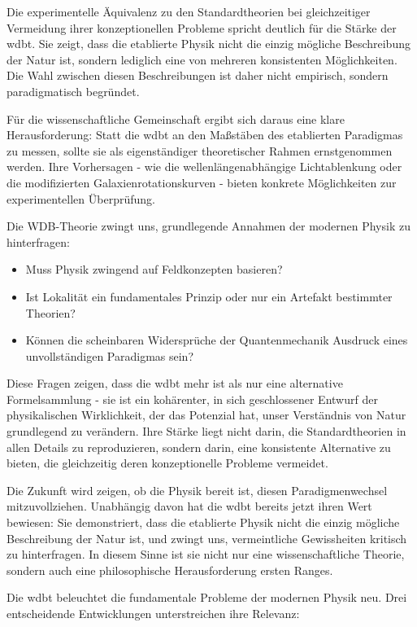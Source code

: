 \documentclass[11pt, a5paper, twoside, openright]{book}
\begin{document}
Die experimentelle Äquivalenz zu den Standardtheorien bei gleichzeitiger Vermeidung ihrer konzeptionellen Probleme spricht deutlich für die Stärke der \gls{wdbt}. Sie zeigt,
dass die etablierte Physik nicht die einzig mögliche Beschreibung der Natur ist, sondern lediglich eine von mehreren konsistenten Möglichkeiten. Die Wahl zwischen diesen Beschreibungen
ist daher nicht empirisch, sondern paradigmatisch begründet.

Für die wissenschaftliche Gemeinschaft ergibt sich daraus eine klare Herausforderung: Statt die \gls{wdbt} an den Maßstäben des etablierten Paradigmas zu messen, sollte sie als
eigenständiger theoretischer Rahmen ernstgenommen werden. Ihre Vorhersagen - wie die wellenlängenabhängige Lichtablenkung oder die modifizierten Galaxienrotationskurven - bieten konkrete
Möglichkeiten zur experimentellen Überprüfung.

Die WDB-Theorie zwingt uns, grundlegende Annahmen der modernen Physik zu hinterfragen:
\begin{itemize}
    \item Muss Physik zwingend auf Feldkonzepten basieren?
    \item Ist Lokalität ein fundamentales Prinzip oder nur ein Artefakt bestimmter Theorien?
    \item Können die scheinbaren Widersprüche der Quantenmechanik Ausdruck eines unvollständigen Paradigmas sein?
\end{itemize}
Diese Fragen zeigen, dass die \gls{wdbt} mehr ist als nur eine alternative Formelsammlung - sie ist ein kohärenter, in sich geschlossener Entwurf der physikalischen Wirklichkeit,
der das Potenzial hat, unser Verständnis von Natur grundlegend zu verändern. Ihre Stärke liegt nicht darin, die Standardtheorien in allen Details zu reproduzieren, sondern darin,
eine konsistente Alternative zu bieten, die gleichzeitig deren konzeptionelle Probleme vermeidet.

Die Zukunft wird zeigen, ob die Physik bereit ist, diesen Paradigmenwechsel mitzuvollziehen. Unabhängig davon hat die \gls{wdbt} bereits jetzt ihren Wert bewiesen: Sie demonstriert,
dass die etablierte Physik nicht die einzig mögliche Beschreibung der Natur ist, und zwingt uns, vermeintliche Gewissheiten kritisch zu hinterfragen. In diesem Sinne ist sie nicht
nur eine wissenschaftliche Theorie, sondern auch eine philosophische Herausforderung ersten Ranges.

Die \gls{wdbt} beleuchtet die fundamentale Probleme der modernen Physik neu. Drei entscheidende Entwicklungen unterstreichen ihre Relevanz:
\end{document}
